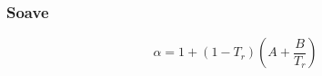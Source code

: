 \subsubsection{Soave \cite{soaveR}}

\begin{equation}\label{eq:soaveR}
\alpha= 1+\left(1-T_r\right)\left(A + \frac{B}{T_r}\right)
\end{equation}